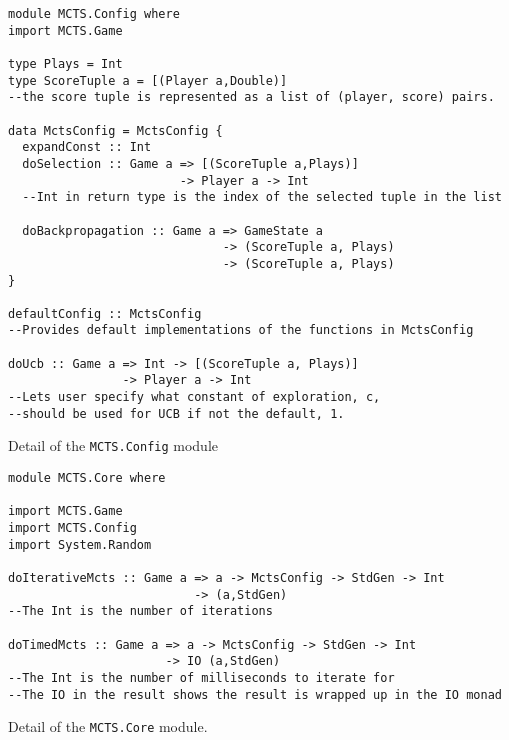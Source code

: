 \begin{fragment}
\begin{lstlisting}
module MCTS.Config where
import MCTS.Game

type Plays = Int
type ScoreTuple a = [(Player a,Double)] 
--the score tuple is represented as a list of (player, score) pairs.

data MctsConfig = MctsConfig {  
  expandConst :: Int
  doSelection :: Game a => [(ScoreTuple a,Plays)] 
                        -> Player a -> Int
  --Int in return type is the index of the selected tuple in the list
  
  doBackpropagation :: Game a => GameState a
                              -> (ScoreTuple a, Plays)
                              -> (ScoreTuple a, Plays)
}

defaultConfig :: MctsConfig
--Provides default implementations of the functions in MctsConfig

doUcb :: Game a => Int -> [(ScoreTuple a, Plays)] 
                -> Player a -> Int
--Lets user specify what constant of exploration, c,
--should be used for UCB if not the default, 1.

\end{lstlisting}
\caption{Detail of the \texttt{MCTS.Config} module}
\label{frag:module_config}
\end{fragment}

\begin{fragment}
\begin{lstlisting}
module MCTS.Core where

import MCTS.Game
import MCTS.Config
import System.Random

doIterativeMcts :: Game a => a -> MctsConfig -> StdGen -> Int 
                          -> (a,StdGen)
--The Int is the number of iterations

doTimedMcts :: Game a => a -> MctsConfig -> StdGen -> Int 
                      -> IO (a,StdGen)
--The Int is the number of milliseconds to iterate for
--The IO in the result shows the result is wrapped up in the IO monad

\end{lstlisting}
\caption{Detail of the \texttt{MCTS.Core} module.}
\label{frag:module_core}
\end{fragment}

